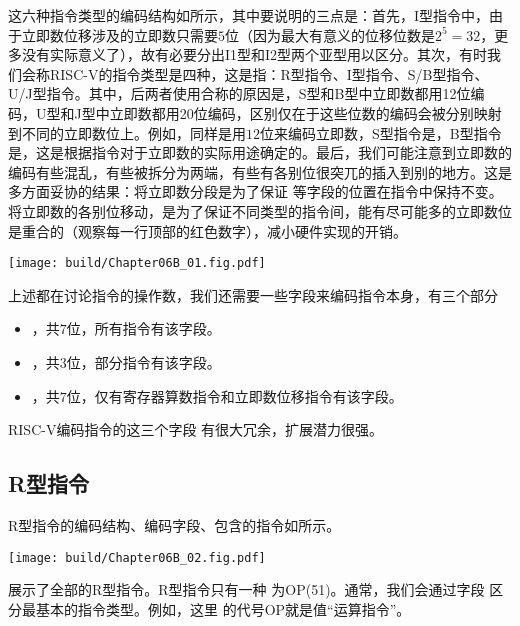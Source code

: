 这六种指令类型的编码结构如所示，其中要说明的三点是：首先，I型指令中，由于立即数位移涉及的立即数只需要$5$位（因为最大有意义的位移位数是$2^5=32$，更多没有实际意义了），故有必要分出I1型和I2型两个亚型用以区分。其次，有时我们会称RISC-V的指令类型是四种，这是指：R型指令、I型指令、S/B型指令、U/J型指令。其中，后两者使用合称的原因是，S型和B型中立即数都用12位编码，U型和J型中立即数都用20位编码，区别仅在于这些位数的编码会被分别映射到不同的立即数位上。例如，同样是用$12$位来编码立即数，S型指令是，B型指令是，这是根据指令对于立即数的实际用途确定的。最后，我们可能注意到立即数的编码有些混乱，有些被拆分为两端，有些有各别位很突兀的插入到别的地方。这是多方面妥协的结果：将立即数分段是为了保证 等字段的位置在指令中保持不变。将立即数的各别位移动，是为了保证不同类型的指令间，能有尽可能多的立即数位是重合的（观察每一行顶部的红色数字），减小硬件实现的开销。

\begin{Figure}
    \texttt{[image: build/Chapter06B\_01.fig.pdf]}
\end{Figure}

上述都在讨论指令的操作数，我们还需要一些字段来编码指令本身，有三个部分
\begin{itemize}
    \item {}，共$7$位，所有指令有该字段。
    \item {}，共$3$位，部分指令有该字段。
    \item {}，共$7$位，仅有寄存器算数指令和立即数位移指令有该字段。
\end{itemize}

RISC-V编码指令的这三个字段 有很大冗余，扩展潜力很强。

\subsection{R型指令}

R型指令的编码结构、编码字段、包含的指令如所示。
\begin{Figure}[R型指令的编码]
    \texttt{[image: build/Chapter06B\_02.fig.pdf]}
\end{Figure}

展示了全部的R型指令。R型指令只有一种 为OP(51)。通常，我们会通过字段 区分最基本的指令类型。例如，这里 的代号OP就是值“运算指令”。


